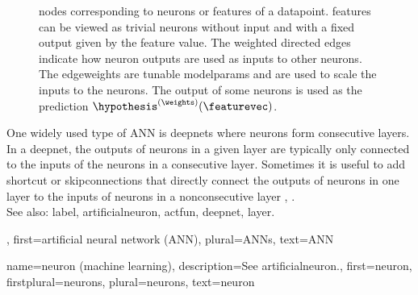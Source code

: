 {{\begin{figure}[H]
{			nodes corresponding to \glspl{neuron} or \glspl{feature} of a \gls{datapoint}. \Glspl{feature} 
			can be viewed as trivial \glspl{neuron} without input and with a fixed \gls{output} given by the 
			\gls{feature} value. The weighted directed edges indicate how \gls{neuron} \glspl{output} are used 
			as inputs to other \glspl{neuron}. The \glspl{edgeweight} are tunable \glspl{modelparam} and are 
			used to scale the inputs to the \glspl{neuron}. The \gls{output} of some \glspl{neuron} is used as the 
			\gls{prediction} $\hypothesis^{(\weights)}(\featurevec)$. \label{fig_ANN_DAG_dict}}
 		\end{figure}
		One widely used type of ANN is \glspl{deepnet} 
		where \glspl{neuron} form consecutive \glspl{layer}. In a \gls{deepnet}, the 
		\glspl{output} of \glspl{neuron} in a given \gls{layer} are typically only connected 
		to the inputs of the \glspl{neuron} in a consecutive \gls{layer}. Sometimes it 
		is useful to add shortcut or \glspl{skipconnection} that directly connect the \glspl{output} of 
		\glspl{neuron} in one \gls{layer} to the inputs of \glspl{neuron} in a nonconsecutive \gls{layer} 
		\cite{Goodfellow-et-al-2016}, \cite{HeResidual2016}.	
		\\
		See also: \gls{label}, \gls{artificialneuron}, \gls{actfun}, \gls{deepnet}, \gls{layer}.},
	first={artificial neural network (ANN)},
	plural={ANNs},
	text={ANN}
}

{name={neuron (machine learning)},
	description={See \gls{artificialneuron}.},
	first={neuron},
	firstplural={neurons},
	plural={neurons},
	text={neuron}
}

